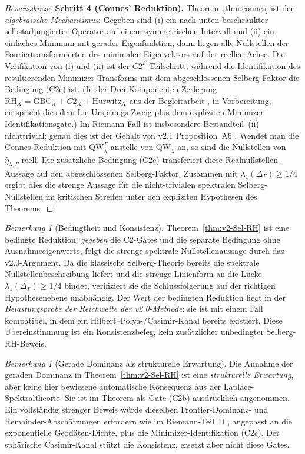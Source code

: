 \documentclass[12pt,a4paper]{article}
\theoremstyle{definition}
\theoremstyle{remark}
\newtheorem{remark}[theorem]{Bemerkung}
\newcommand{\QW}{\mathrm{QW}}
\newcommand{\Delop}{\Delta_{\Gamma}}
\begin{document}
\begin{proof}[Beweisskizze]
\smallskip\noindent
\textbf{Schritt 4 (Connes' Reduktion).} Theorem~\ref{thm:connes} ist der
\emph{algebraische Mechanismus}: Gegeben sind (i) ein nach unten beschränkter
selbstadjungierter Operator auf einem symmetrischen Intervall und (ii) ein
einfaches Minimum mit gerader Eigenfunktion, dann liegen alle Nullstellen der
Fouriertransformierten des minimalen Eigenvektors auf der reellen Achse.  Die
Verifikation von (i) und (ii) ist der $C2^\Gamma$-Teilschritt, während die
Identifikation des resultierenden Minimizer-Transforms mit dem abgeschlossenen
Selberg-Faktor die Bedingung (C2c) ist.  (In der
Drei-Komponenten-Zerlegung $\mathrm{RH}_X = \mathrm{GBC}_X + C2_X + \mathrm{Hurwitz}_X$
aus der Begleitarbeit \cite{GeigerMeta2026}, in Vorbereitung, entspricht dies
dem Lie-Ursprungs-Zweig plus dem expliziten Minimizer-Identifikationsgate.)
Im Riemann-Fall ist insbesondere Bestandteil~(ii) nichttrivial; genau dies ist
der Gehalt von v2.1 Proposition~A6 \cite{Geiger2026partII}.  Wendet man die
Connes-Reduktion mit $\QW^\Gamma_\lambda$ anstelle von $\QW_\lambda$ an, so
sind die Nullstellen von $\widehat{\eta}_{\lambda,\Gamma}$ reell.  Die
zusätzliche Bedingung (C2c) transferiert diese Realnullstellen-Aussage auf den
abgeschlossenen Selberg-Faktor. Zusammen mit $\lambda_1(\Delop)\ge 1/4$ ergibt
dies die strenge Aussage für die nicht-trivialen spektralen Selberg-Nullstellen
im kritischen Streifen unter den expliziten Hypothesen des Theorems.
\end{proof}

\begin{remark}[Bedingtheit und Konsistenz]
Theorem~\ref{thm:v2-Sel-RH} ist eine bedingte Reduktion: \emph{gegeben} die
C2-Gates und die separate Bedingung ohne Ausnahmeeigenwerte, folgt die strenge
spektrale Nullstellenaussage durch das v2.0-Argument.  Da die klassische
Selberg-Theorie bereits die spektrale Nullstellenbeschreibung liefert und die
strenge Linienform an die Lücke $\lambda_1(\Delop)\ge 1/4$ bindet, verifiziert
sie die Schlussfolgerung auf der richtigen Hypothesenebene unabhängig.  Der
Wert der bedingten Reduktion liegt in der \emph{Belastungsprobe der Reichweite
der v2.0-Methode}: sie ist mit einem Fall kompatibel, in dem ein
Hilbert--Pólya-/Casimir-Kanal bereits existiert. Diese Übereinstimmung ist
ein Konsistenzbeleg, kein zusätzlicher unbedingter Selberg-RH-Beweis.
\end{remark}

\begin{remark}[Gerade Dominanz als strukturelle Erwartung]
\label{rem:even-dominance-structural}
Die Annahme der geraden Dominanz in Theorem~\ref{thm:v2-Sel-RH} ist eine
\emph{strukturelle Erwartung}, aber keine hier bewiesene automatische
Konsequenz aus der Laplace-Spektraltheorie.  Sie ist im Theorem als Gate (C2b)
ausdrücklich angenommen.  Ein vollständig strenger Beweis würde dieselben
Frontier-Dominanz- und Remainder-Abschätzungen erfordern wie im
Riemann-Teil~II \cite{Geiger2026partII}, angepasst an die exponentielle
Geodäten-Dichte, plus die Minimizer-Identifikation (C2c).  Der sphärische
Casimir-Kanal stützt die Konsistenz, ersetzt aber nicht diese Gates.
\end{remark}
\end{document}
